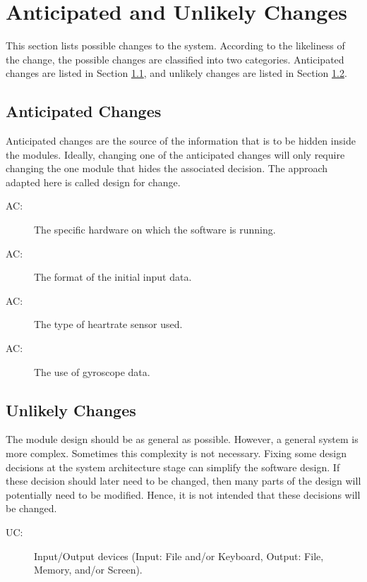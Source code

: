 \documentclass[12pt, titlepage]{article}
\newcounter{acnum}
\newcommand{\actheacnum}{AC\theacnum}
\newcounter{ucnum}
\newcommand{\uctheucnum}{UC\theucnum}
\begin{document}
\section{Anticipated and Unlikely Changes} \label{SecChange}

This section lists possible changes to the system. According to the likeliness
of the change, the possible changes are classified into two
categories. Anticipated changes are listed in Section \ref{SecAchange}, and
unlikely changes are listed in Section \ref{SecUchange}.

\subsection{Anticipated Changes} \label{SecAchange}

Anticipated changes are the source of the information that is to be hidden
inside the modules. Ideally, changing one of the anticipated changes will only
require changing the one module that hides the associated decision. The approach
adapted here is called design for
change.

\begin{description}
  \item[ \actheacnum \label{acHardware}:] The specific
    hardware on which the software is running.
  \item[ \actheacnum \label{acInput}:] The format of the
    initial input data.
  \item[ \actheacnum \label{acSensor}:] The type of heartrate sensor used.
\item[ \actheacnum \label{acData}:] The use of gyroscope data.
\end{description}

\subsection{Unlikely Changes} \label{SecUchange}

The module design should be as general as possible. However, a general system is
more complex. Sometimes this complexity is not necessary. Fixing some design
decisions at the system architecture stage can simplify the software design. If
these decision should later need to be changed, then many parts of the design
will potentially need to be modified. Hence, it is not intended that these
decisions will be changed.

\begin{description}
  \item[ \uctheucnum \label{ucIO}:] Input/Output devices
    (Input: File and/or Keyboard, Output: File, Memory, and/or Screen).
\end{description}
\end{document}
